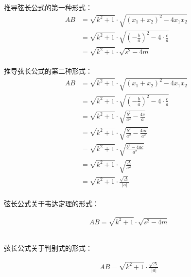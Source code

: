 \documentclass[UTF8]{ctexart}
\begin{document}
    推导弦长公式的第一种形式：
    \begin{align}
        AB&=\sqrt{k^2+1}\cdot\sqrt{(x_1+x_2)^2-4x_1x_2}\\[4mm]
        &=\sqrt{k^2+1}\cdot\sqrt{\left(-\frac{b}{a}\right)^2-4\cdot\frac{c}{a}}\\[4mm]
        &=\sqrt{k^2+1}\cdot\sqrt{s^2-4m}
    \end{align}\\
    推导弦长公式的第二种形式：
    \begin{align}
        AB&=\sqrt{k^2+1}\cdot\sqrt{(x_1+x_2)^2-4x_1x_2}\\[4mm]
        &=\sqrt{k^2+1}\cdot\sqrt{\left(-\frac{b}{a}\right)^2-4\cdot\frac{c}{a}}\\[4mm]
        &=\sqrt{k^2+1}\cdot\sqrt{\frac{b^2}{a^2}-\frac{4c}{a}}\\[4mm]
        &=\sqrt{k^2+1}\cdot\sqrt{\frac{b^2}{a^2}-\frac{4ac}{a^2}}\\[4mm]
        &=\sqrt{k^2+1}\cdot\sqrt{\frac{b^2-4ac}{a^2}}\\[4mm]
        &=\sqrt{k^2+1}\cdot\sqrt{\frac{\Delta}{a^2}}\\[4mm]
        &=\sqrt{k^2+1}\cdot\frac{\sqrt{\Delta}}{~\left|a\right|}
    \end{align}\\
    弦长公式关于韦达定理的形式：\vspace{3pt}
    \begin{large}
        \begin{align*}
            &AB=\sqrt{k^2+1}\cdot\sqrt{s^2-4m}
        \end{align*}
    \end{large}\\
    弦长公式关于判别式的形式：
    \begin{large}
        \begin{align*}
            &AB=\sqrt{k^2+1}\cdot\frac{\sqrt{\Delta}}{~\left|a\right|}
        \end{align*}
    \end{large}

\newpage
\end{document}
